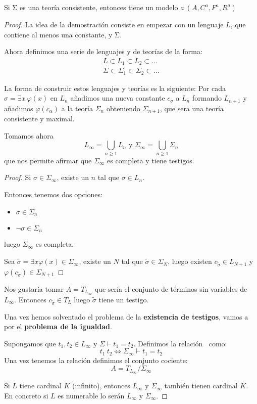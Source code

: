 \begin{theorem}
Si Σ es una teoría consistente, entonces tiene un modelo $a\ (A,C^a,F^a,R^a)$
\end{theorem}
\begin{proof}
La idea de la demostración consiste en empezar con un lenguaje $L$, que contiene al menos una constante, y Σ.

Ahora definimos una serie de lenguajes y de teorías de la forma:
\[\begin{array}{l}
L \subset L_1 \subset L_2 \subset ... \\
Σ \subset Σ_1 \subset Σ_2 \subset ...
\end{array}\]

La forma de construir estos lenguajes y teorías es la siguiente: Por cada $σ=\exists x\ \varphi(x)$ en $L_n$ añadimos una nueva constante $c_σ$ a $L_n$ formando $L_{n+1}$ y añadimos $\varphi(c_α)$ a la teoría $Σ_n$ obteniendo $Σ_{n+1}$, que sera una teoría consistente y maximal.

Tomamos ahora
\[L_{\infty} = \bigcup_{n \geq 1} L_n \text{ y } Σ_{\infty} = \bigcup_{n \geq 1} Σ_n\]
que nos permite afirmar que $Σ_{\infty}$ es completa y tiene testigos.
\begin{proof}
Si $σ \in Σ_{\infty}$, existe un $n$ tal que $σ\in L_n$.

Entonces tenemos dos opciones:
\begin{itemize}
\item $σ \in Σ_n$
\item $\neg σ \in Σ_n$
\end{itemize}
luego $Σ_{\infty}$ es completa.

Sea $\tilde{σ} = \exists x \varphi(x) \in Σ_{\infty}$, existe un $N$ tal que $\tilde{σ} \in Σ_N$, luego existen $c_{\tilde{σ}} \in L_{N+1}$ y $\varphi(c_{\tilde{σ}})\in Σ_{N+1}$
\end{proof}

Nos gustaría tomar $A=T_{L_{\infty}}$ que sería el conjunto de términos sin variables de $L_{\infty}$. Entonces $c_{\tilde{σ}} \in T_L$ luego $\tilde{σ}$ tiene un testigo.

Una vez hemos solventado el problema de la \textbf{existencia de testigos}, vamos a por el \textbf{problema de la igualdad}.

Supongamos que $t_1,t_2 \in L_{\infty}$ y $Σ \vdash t_1=t_2$. Definimos la relación $~$ como:
\[t_1 ~ t_2 \iff Σ_{\infty} \vdash t_1=t_2 \]
Una vez tenemos la relación definimos el conjunto cociente:
\[A = T_{L_{\infty}}/Σ_{\infty}\]

\obs Si $L$ tiene cardinal $K$ (infinito), entonces $L_{\infty}$ y $Σ_{\infty}$ también tienen cardinal $K$. En concreto si $L$ es numerable lo serán $L_{\infty}$ y $Σ_{\infty}$.
\end{proof}

